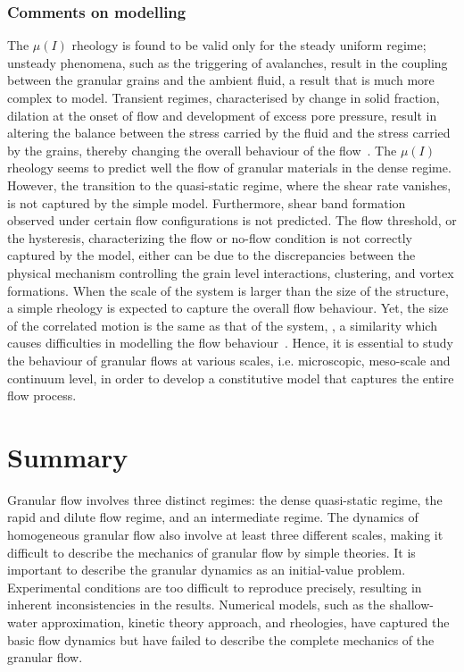 \newpage

\subsubsection{Comments on modelling}

The $\mu(\textit{I})$ rheology is found to be valid only for the steady uniform 
regime; unsteady phenomena, such as the triggering of avalanches, result in the
coupling between the granular grains and the ambient fluid, a result that is 
much more complex to model. Transient regimes, characterised by change in solid 
fraction, dilation at the onset of flow and development of excess pore 
pressure, result in altering the balance between the stress carried by the 
fluid and the stress 
carried by the grains, thereby changing the overall behaviour of the 
flow~\citep{Denlinger2001}. The $\mu (I)$ rheology seems to predict well the 
flow of granular materials in the dense regime. However, the transition to the 
quasi-static regime, where the shear rate vanishes, is not captured by the 
simple model. Furthermore, shear band formation observed under certain flow 
configurations is not predicted. The flow threshold, or the hysteresis, 
characterizing the flow or no-flow condition is not correctly captured by the 
model, either can be due to the discrepancies between the physical mechanism 
controlling the grain level interactions, clustering, and vortex formations. 
When the scale of the system is larger than the size of the structure, a simple 
rheology is expected to capture the overall flow behaviour. Yet, the size of 
the correlated motion is the same as that of the system, , a similarity which 
causes difficulties in modelling the flow behaviour~\citep{Pouliquen2005}. 
Hence, it is essential 
to study the behaviour of granular flows at various scales, i.e. microscopic, 
meso-scale and continuum level, in order to develop a constitutive model 
that captures the entire flow process.

\section{Summary}
Granular flow involves three distinct regimes: the dense quasi-static regime, 
the rapid and dilute flow regime, and an intermediate regime. The dynamics of 
homogeneous granular flow also involve at least three different scales, making 
it difficult to describe the mechanics of granular flow by simple theories. It 
is important to describe the granular dynamics as an initial-value problem. 
Experimental conditions are too difficult to reproduce precisely, 
resulting in inherent inconsistencies in the results. Numerical models, such as 
the shallow-water approximation, kinetic theory approach, and rheologies, have 
captured the basic flow dynamics but have failed to describe 
the complete mechanics of the granular flow.

